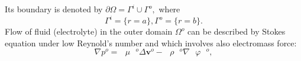 \documentclass{amsart}
\begin{document}
Its boundary is denoted by $\partial\Omega=\Gamma^i\cup\Gamma^o,$ where
$$\Gamma^i=\{r=a\}, \Gamma^o=\{r=b\}.$$  %
Flow of fluid (electrolyte) in the outer domain $\Omega^o$ can be described by Stokes equation under low Reynold's number and which involves also electromass force:
\begin{equation}\label{St_eq}
\nabla {{p}^{o}}={{\text{ }\!\!\mu\!\!\text{ }}^{o}}\Delta {{\mathbf{v}}^{o}}-{{\text{ }\!\!\rho\!\!\text{ }}^{o}}\nabla {{\text{ }\!\!\varphi\!\!\text{ }}^{o}},
\end{equation}																								
\end{document}
